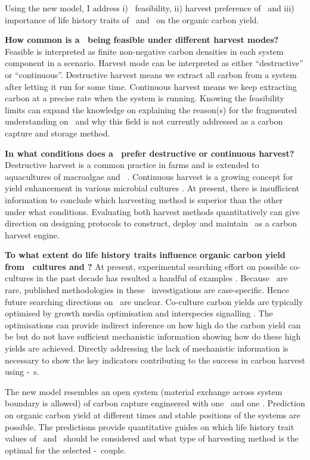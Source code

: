 \documentclass[../thesis.tex]{subfiles} %
\begin{document}
Using the new model, I address \Rn{1}) \pbs\ feasibility, \Rn{2}) harvest preference of \pbs\ and \Rn{3}) importance of life history traits of \phy\ and \bac\ on the organic carbon yield.

\textbf{How common is a \pbs\ being feasible under different harvest modes?}  Feasible is interpreted as finite non-negative carbon densities in each system component in a scenario.  Harvest mode can be interpreted as either ``destructive” or ``continuous”.  Destructive harvest means we extract all carbon from a system after letting it run for some time.  Continuous harvest means we keep extracting carbon at a precise rate when the system is running.  Knowing the feasibility limits can expand the knowledge on explaining the reason(s) for the fragmented understanding \autocite{fuentes2016impact} on \pbs\ and why this field is not currently addressed as a carbon capture and storage method.

\textbf{In what conditions does a \pbs\ prefer destructive or continuous harvest?}  Destructive harvest is a common practice in farms and is extended to aquacultures of macroalgae \autocite{duarte2017can} and \phy\  \autocite{evanson_2019}.  Continuous harvest is a growing concept for yield enhancement in various microbial cultures \autocite{aytekin2016statistical,fuentes2016impact}.  At present, there is insufficient information to conclude which harvesting method is superior than the other under what conditions.  Evaluating both harvest methods quantitatively can give direction on designing protocols to construct, deploy and maintain \pbs\ as a carbon harvest engine.

\textbf{To what extent do life history traits influence organic carbon yield from \phy\ cultures and \pbs?}  At present, experimental searching effort on possible co-cultures in the past decade has resulted a handful of examples \autocite{fuentes2016impact,santos2014microalgal}.  Because \pbs\ are rare, published methodologies in these \pbs\ investigations are case-specific.  Hence future searching directions on \pbs\ are unclear.  Co-culture carbon yields are typically optimised by growth media optimisation \autocite{aytekin2016statistical,fuentes2016impact} and interspecies signalling \autocite{fuentes2016impact}.  The optimisations can provide indirect inference on how high do the carbon yield can be but do not have sufficient mechanistic information showing how do these high yields are achieved.  Directly addressing the lack of mechanistic information is necessary to show the key indicators contributing to the success in carbon harvest using \phy-\bac\ \pbs s.

The new model resembles an open system (material exchange across system boundary is allowed) of carbon capture engineered with one \phy\ and one \bac.  Prediction on organic carbon yield at different times and stable positions of the systems are possible.  The predictions provide quantitative guides on which life history trait values of \phy\ and \bac\ should be considered and what type of harvesting method is the optimal for the selected \phy-\bac\ couple.
\end{document}
